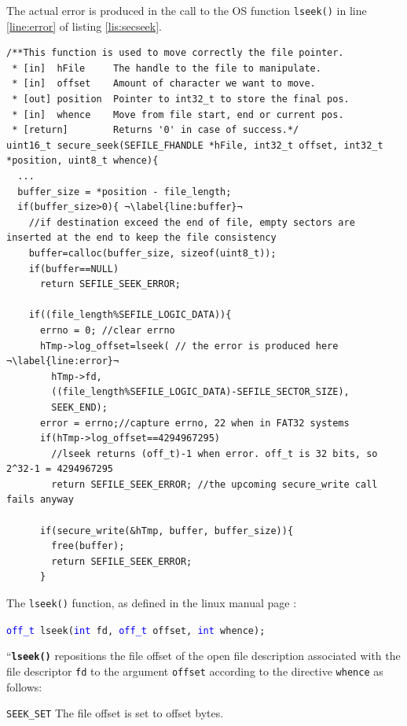 The actual error is produced in the call to the OS function \texttt{lseek()} in line \ref{line:error} of listing \ref{lis:secseek}. 
\begin{lstlisting}[style=customc, float=htb, caption={FAT32 Error origin at secure\_seek}, label = {lis:secseek}, escapechar=¬]
/**This function is used to move correctly the file pointer.
 * [in]  hFile     The handle to the file to manipulate.
 * [in]  offset    Amount of character we want to move.
 * [out] position  Pointer to int32_t to store the final pos.
 * [in]  whence    Move from file start, end or current pos.
 * [return]        Returns '0' in case of success.*/
uint16_t secure_seek(SEFILE_FHANDLE *hFile, int32_t offset, int32_t *position, uint8_t whence){
  ...  
  buffer_size = *position - file_length;
  if(buffer_size>0){ ¬\label{line:buffer}¬
    //if destination exceed the end of file, empty sectors are inserted at the end to keep the file consistency
    buffer=calloc(buffer_size, sizeof(uint8_t));
    if(buffer==NULL)
      return SEFILE_SEEK_ERROR;
    
    if((file_length%SEFILE_LOGIC_DATA)){
      errno = 0; //clear errno 
      hTmp->log_offset=lseek( // the error is produced here ¬\label{line:error}¬
        hTmp->fd, 
        ((file_length%SEFILE_LOGIC_DATA)-SEFILE_SECTOR_SIZE), 
        SEEK_END);
      error = errno;//capture errno, 22 when in FAT32 systems
      if(hTmp->log_offset==4294967295)
        //lseek returns (off_t)-1 when error. off_t is 32 bits, so 2^32-1 = 4294967295
        return SEFILE_SEEK_ERROR; //the upcoming secure_write call fails anyway
      
      if(secure_write(&hTmp, buffer, buffer_size)){
        free(buffer);
        return SEFILE_SEEK_ERROR;
      }   
\end{lstlisting}

\vspace{15pt}
The \texttt{lseek()} function, as defined in the linux manual page \cite{lseek}:

\texttt{\textcolor{blue}{off\_t} lseek(\textcolor{blue}{int} fd, \textcolor{blue}{off\_t} offset, \textcolor{blue}{int} whence);}

``\textbf{\texttt{lseek()}} repositions the file offset of the open file description
       associated with the file descriptor \texttt{fd} to the argument \texttt{offset}
       according to the directive \texttt{whence} as follows:
       
       \texttt{SEEK\_SET} The file offset is set to offset bytes.
       

